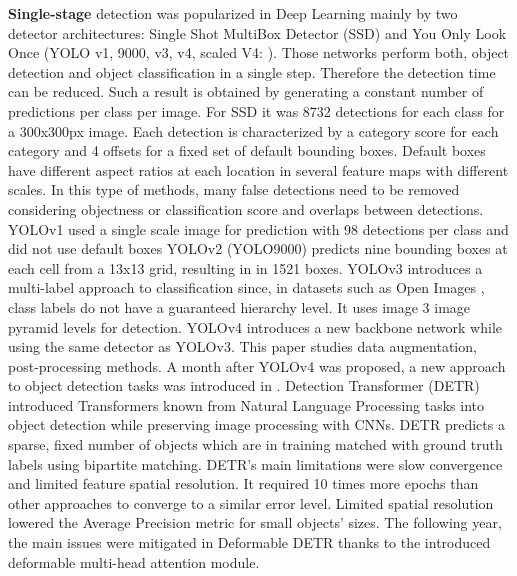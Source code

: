 \documentclass{article}
\begin{document}
\textbf{Single-stage} detection was popularized in Deep Learning mainly by two detector architectures: Single Shot MultiBox Detector (SSD) \cite{liu2016ssd} and You Only Look Once (YOLO v1, 9000, v3, v4, scaled V4: \cite{redmon2016you,redmon2017yolo9000,redmon2018yolov3,bochkovskiy2020yolov4,wang2020scaled}).
Those networks perform both, object detection and object classification in a single step. Therefore the detection time can be reduced.
Such a result is obtained by generating a constant number of predictions per class per image.
For SSD it was 8732 detections for each class for a 300x300px image.
Each detection is characterized by a category score for each category and 4 offsets for a fixed set of default bounding boxes.
Default boxes have different aspect ratios at each location in several feature maps with different scales.
In this type of methods, many false detections need to be removed considering objectness or classification score and overlaps between detections.
YOLOv1 used a single scale image for prediction with 98 detections per class and did not use default boxes
YOLOv2 (YOLO9000) predicts nine bounding boxes at each cell from a 13x13 grid, resulting in in 1521 boxes.
YOLOv3 introduces a multi-label approach to classification since, in datasets such as Open Images \cite{kuznetsova2020open}, class labels do not have a guaranteed hierarchy level.
It uses image 3 image pyramid levels for detection.
YOLOv4 introduces a new backbone network while using the same detector as YOLOv3.
This paper studies data augmentation, post-processing methods.
A month after YOLOv4 \cite{bochkovskiy2020yolov4} was proposed, a new approach to object detection tasks was introduced in \cite{carion2020end}.
Detection Transformer (DETR) introduced Transformers known from Natural Language Processing tasks \cite{vaswani2017attention} into object detection while preserving image processing with CNNs.
DETR predicts a sparse, fixed number of objects which are in training matched with ground truth labels using bipartite matching.
DETR's main limitations were slow convergence and limited feature spatial resolution.
It required 10 times more epochs than other approaches to converge to a similar error level.
Limited spatial resolution lowered the Average Precision metric for small objects' sizes.
The following year, the main issues were mitigated in Deformable DETR \cite{zhu2020deformable} thanks to the introduced deformable multi-head attention module.
\end{document}
